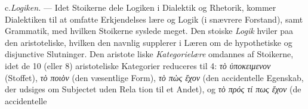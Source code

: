 \documentclass[12pt,a4paper]{book}
\newcommand{\gk}[1]{\textit{#1}}
\begin{document}
c.\enspace \emph{Logiken.} --- Idet Stoikerne dele Logiken i Dialektik
og Rhetorik, kommer Dialektiken til at omfatte Erkjendelses\-%
lære og Logik (i snævrere Forstand), samt Grammatik, med
hvilken Stoikerne syslede meget. Den stoiske \emph{Logik} hviler
paa den aristoteliske, hvilken den navnlig supplerer i Læren
om de hypothetiske og disjunctive Slutninger. Den aristote\-%
liske \emph{Kategorielære} omdannes af Stoikerne, idet de 10
(eller 8) aristoteliske Kategorier reduceres til 4: \gk{τὸ ὑποκειμενον}
(Stoffet), \gk{τὸ ποιὸν} (den væsentlige Form), \gk{τὸ πὼς ἔχον} (den
accidentelle Egenskab, der udsiges om Subjectet uden Rela\-%
tion til et Andet), og \gk{τὸ πρός τί πως ἔχον} (de accidentelle
\end{document}
